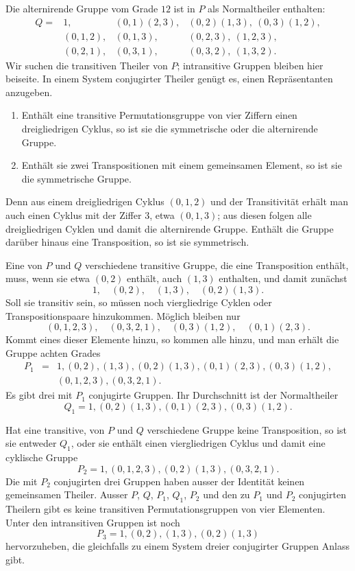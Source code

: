 \documentclass[11pt]{article}
\begin{document}
Die alternirende Gruppe vom Grade $12$ ist in $P$ als Normaltheiler enthalten:
\[
\begin{array}{llll}
Q=&1,&(0,1)(2,3),&(0,2)(1,3),\ (0,3)(1,2),\\
 &(0,1,2),&(0,1,3),&(0,2,3),\ (1,2,3),\\
 &(0,2,1),&(0,3,1),&(0,3,2),\ (1,3,2).
\end{array}
\tag{2}
\]
Wir suchen die transitiven Theiler von $P$; intransitive Gruppen bleiben hier beiseite. In einem System conjugirter Theiler genügt es, einen Repräsentanten anzugeben.

\begin{enumerate}[label=\arabic*.,leftmargin=2em]
\item Enthält eine transitive Permutationsgruppe von vier Ziffern einen dreigliedrigen Cyklus, so ist sie die symmetrische oder die alternirende Gruppe.
\item Enthält sie zwei Transpositionen mit einem gemeinsamen Element, so ist sie die symmetrische Gruppe.
\end{enumerate}

Denn aus einem dreigliedrigen Cyklus $(0,1,2)$ und der Transitivität erhält man auch einen Cyklus mit der Ziffer $3$, etwa $(0,1,3)$; aus diesen folgen alle dreigliedrigen Cyklen und damit die alternirende Gruppe. Enthält die Gruppe darüber hinaus eine Transposition, so ist sie symmetrisch.

Eine von $P$ und $Q$ verschiedene transitive Gruppe, die eine Transposition enthält, muss, wenn sie etwa $(0,2)$ enthält, auch $(1,3)$ enthalten, und damit zunächst
\[
        1,
\quad (0,2),
\quad (1,3),
\quad (0,2)(1,3).
\tag{3}
\]
Soll sie transitiv sein, so müssen noch viergliedrige Cyklen oder Transpositionspaare hinzukommen. Möglich bleiben nur
\[
        (0,1,2,3),
\quad (0,3,2,1),
\quad (0,3)(1,2),
\quad (0,1)(2,3).
\tag{4}
\]
Kommt eines dieser Elemente hinzu, so kommen alle hinzu, und man erhält die Gruppe achten Grades
\[
\begin{array}{rcl}
P_1&=&1,
(0,2),
(1,3),
(0,2)(1,3),
(0,1)(2,3),
(0,3)(1,2),\\[0.2em]
&& (0,1,2,3),
(0,3,2,1).
\end{array}
\tag{5}
\]
Es gibt drei mit $P_1$ conjugirte Gruppen. Ihr Durchschnitt ist der Normaltheiler
\[
        Q_1=1,
(0,2)(1,3),
(0,1)(2,3),
(0,3)(1,2).
\tag{6}
\]

Hat eine transitive, von $P$ und $Q$ verschiedene Gruppe keine Transposition, so ist sie entweder $Q_1$, oder sie enthält einen viergliedrigen Cyklus und damit eine cyklische Gruppe
\[
        P_2=1,
(0,1,2,3),
(0,2)(1,3),
(0,3,2,1).
\tag{7}
\]
Die mit $P_2$ conjugirten drei Gruppen haben ausser der Identität keinen gemeinsamen Theiler. Ausser $P$, $Q$, $P_1$, $Q_1$, $P_2$ und den zu $P_1$ und $P_2$ conjugirten Theilern gibt es keine transitiven Permutationsgruppen von vier Elementen. Unter den intransitiven Gruppen ist noch
\[
        P_3=1,
(0,2),
(1,3),
(0,2)(1,3)
\]
hervorzuheben, die gleichfalls zu einem System dreier conjugirter Gruppen Anlass gibt.
\end{document}
